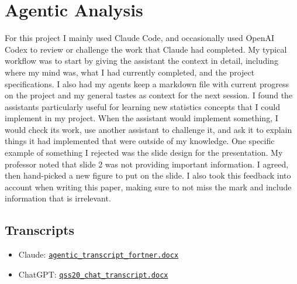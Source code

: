 \documentclass[9pt,twoside]{pnas-new}
\begin{document}
\appendix
\section{Agentic Analysis}

For this project I mainly used Claude Code, and occasionally used OpenAI Codex
to review or challenge the work that Claude had completed. My typical workflow
was to start by giving the assistant the context in detail, including where my
mind was, what I had currently completed, and the project specifications. I
also had my agents keep a markdown file with current progress on the project
and my general tastes as context for the next session. I found the assistants
particularly useful for learning new statistics concepts that I could implement
in my project. When the assistant would implement something, I would check its
work, use another assistant to challenge it, and ask it to explain things it
had implemented that were outside of my knowledge. One specific example of
something I rejected was the slide design for the presentation. My professor
noted that slide 2 was not providing important information. I agreed, then
hand-picked a new figure to put on the slide. I also took this feedback into
account when writing this paper, making sure to not miss the mark and include
information that is irrelevant.

\subsection*{Transcripts}

\begin{itemize}\itemsep2pt
\item Claude: \href{https://docs.google.com/document/d/16tEyKmXsj5zVQupSGv-JQbtHahILT8lN/edit?usp=sharing}{\texttt{agentic\_transcript\_fortner.docx}}
\item ChatGPT: \href{https://docs.google.com/document/d/1VHYOB-BYbF-cUh4MJhan6rHSXbE5qv2O/edit?usp=sharing}{\texttt{qss20\_chat\_transcript.docx}}
\end{itemize}
\end{document}
